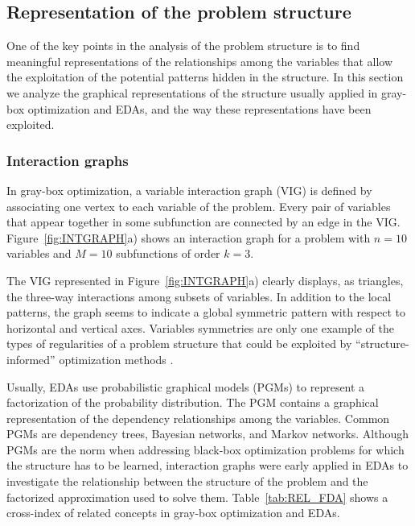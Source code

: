 \documentclass{article} %
\begin{document}
\subsection{Representation of the problem structure}

  One of the key points in the analysis of the problem structure is to find meaningful representations of the relationships among the variables that allow the exploitation of the potential patterns hidden in the structure. In this section we analyze the graphical representations of the structure usually applied in gray-box optimization and EDAs, and the way these representations have been exploited. 
 
 \subsubsection{Interaction graphs}

   In gray-box optimization, a  variable interaction graph (VIG)  \cite{Chicano_et_2014,Whitley_and_Chen:2012} is defined by associating one vertex to each variable of the problem. Every pair of variables that appear together in some subfunction are connected by an edge in the VIG. Figure~\ref{fig:INTGRAPH}a) shows  an interaction graph for a problem with $n=10$ variables and $M=10$ subfunctions of order $k=3$. 

The VIG represented in  Figure~\ref{fig:INTGRAPH}a) clearly displays, as triangles, the three-way interactions among subsets of variables. In addition to the local patterns, the graph seems to indicate a global symmetric pattern with respect to horizontal and vertical axes. Variables symmetries \cite{Choi_et_al:2007,Munteanu_and_Rosa:2007} are only one example of the types of regularities of a problem structure that could be exploited by ``structure-informed'' optimization methods \cite{Picek_et_al:2015,Santana_et_al:2013a}.  

  Usually, EDAs use probabilistic graphical models  (PGMs) to represent a factorization of the probability distribution. The PGM contains a graphical representation of the dependency relationships among the variables. Common PGMs are dependency trees, Bayesian networks, and Markov networks. Although PGMs are the norm when addressing black-box optimization problems for which the structure has to be learned, interaction graphs were early applied in EDAs \cite{Muhlenbein_and_Hoens:2005,Muehlenbein_and_Hoens:2006,Santana_et_al:2005b} to investigate the relationship between the structure of the problem and the factorized approximation used to solve them.  Table~\ref{tab:REL_FDA} shows a cross-index of related concepts in gray-box optimization and EDAs.
\end{document}
